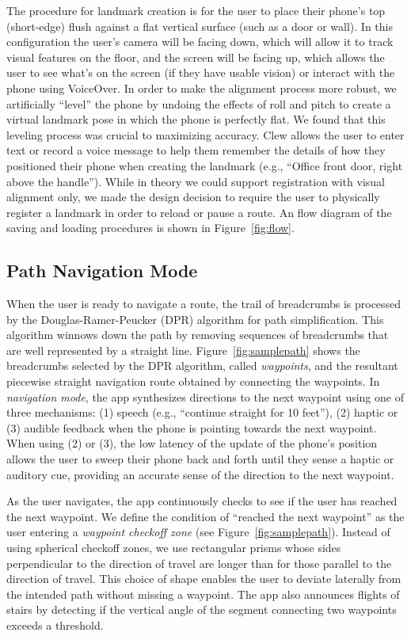 \documentclass[chi_draft]{sigchi}
\begin{document}
The procedure for landmark creation is for the user to place their phone's top (short-edge) flush against a flat vertical surface (such as a door or wall).  In this configuration the user's camera will be facing down, which will allow it to track visual features on the floor, and the screen will be facing up, which allows the user to see what's on the screen (if they have usable vision) or interact with the phone using VoiceOver.  In order to make the alignment process more robust, we artificially ``level'' the phone by undoing the effects of roll and pitch to create a virtual landmark pose in which the phone is perfectly flat.  We found that this leveling process was crucial to maximizing accuracy.  Clew allows the user to enter text or record a voice message to help them remember the details of how they positioned their phone when creating the landmark (e.g., ``Office front door, right above the handle'').  While in theory we could support registration with visual alignment only, we made the design decision to require the user to physically register a landmark in order to reload or pause a route.  An flow diagram of the saving and loading procedures is shown in Figure~\ref{fig:flow}.

\subsection{Path Navigation Mode}\label{sec:pathnavigationmode}

When the user is ready to navigate a route, the trail of breadcrumbs is processed by the Douglas-Ramer-Peucker (DPR) algorithm \cite{douglas1973algorithms} for path simplification.  This algorithm winnows down the path by removing sequences of breadcrumbs that are well represented by a straight line.  Figure~\ref{fig:samplepath} shows the breadcrumbs selected by the DPR algorithm, called \emph{waypoints}, and the resultant piecewise straight navigation route obtained by connecting the waypoints.  In \emph{navigation mode}, the app synthesizes directions to the next waypoint using one of three mechanisms: (1) speech (e.g., ``continue straight for 10 feet''), (2) haptic or (3) audible feedback when the phone is pointing towards the next waypoint.  When using (2) or (3), the low latency of the update of the phone's position allows the user to sweep their phone back and forth until they sense a haptic or auditory cue, providing an accurate sense of the direction to the next waypoint.

As the user navigates, the app continuously checks to see if the user has reached the next waypoint.  We define the condition of ``reached the next waypoint'' as the user entering a \emph{waypoint checkoff zone} (see Figure~\ref{fig:samplepath}).  Instead of using spherical checkoff zones, we use rectangular prisms whose sides perpendicular to the direction of travel are longer than for those parallel to the direction of travel.  This choice of shape enables the user to deviate laterally from the intended path without missing a waypoint.  The app also announces flights of stairs by detecting if the vertical angle of the segment connecting two waypoints exceeds a threshold.
\end{document}
